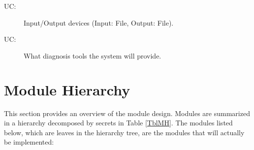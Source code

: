\documentclass[12pt, titlepage]{article}
\newcounter{ucnum}
\newcommand{\uctheucnum}{UC\theucnum}
\begin{document}
\begin{description}
\item[ \uctheucnum \label{ucIO}:] Input/Output devices
  (Input: File, Output: File).
\item[ \uctheucnum \label{ucTasks}:] What diagnosis tools the system will provide.
\end{description}

\section{Module Hierarchy} \label{SecMH}

This section provides an overview of the module design. Modules are summarized
in a hierarchy decomposed by secrets in Table \ref{TblMH}. The modules listed
below, which are leaves in the hierarchy tree, are the modules that will
actually be implemented:
\end{document}
